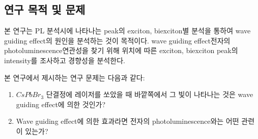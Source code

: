 \subsection{연구 목적 및 문제}
본 연구는 PL 분석시에 나타나는 peak의 exciton, biexciton별 분석을 통하여 wave guiding effect의 원인을 분석하는 것이 목적이다. wave guiding effect\와 전자의 photoluminescence 연관성을 찾기 위해 위치에 따른 exciton, biexciton peak의 intensity를 조사하고 경향성을 분석한다.

본 연구에서 제시하는 연구 문제는 다음과 같다:
\begin{enumerate}
	\item $CsPbBr_3$ 단결정에 레이저를 쏘았을 때 바깥쪽에서 그 빛이 나타나는 것은 wave guiding effect에 의한 것인가?
	\item Wave guiding effect에 의한 효과라면 전자의 photoluminescence와는 어떤 관련이 있는가? 
\end{enumerate}

